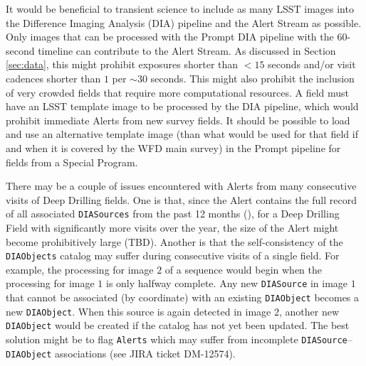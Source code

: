 \documentclass[DM,lsstdoc,toc]{lsstdoc}
\begin{document}
It would be beneficial to transient science to include as many LSST images into the Difference Imaging Analysis (DIA) pipeline and the Alert Stream as possible. Only images that can be processed with the Prompt DIA pipeline with the $60$-second timeline can contribute to the Alert Stream. As discussed in Section \ref{sec:data}, this might prohibit exposures shorter than $<15$ seconds and/or visit cadences shorter than $1$ per $\sim30$ seconds. This might also prohibit the inclusion of very crowded fields that require more computational resources. A field must have an LSST template image to be processed by the DIA pipeline, which would prohibit immediate Alerts from new survey fields. It should be possible to load and use an alternative template image (than what would be used for that field if and when it is covered by the WFD main survey) in the Prompt pipeline for fields from a Special Program. 

There may be a couple of issues encountered with Alerts from many consecutive visits of Deep Drilling fields. One is that, since the Alert contains the full record of all associated {\tt DIASources} from the past 12 months (), for a Deep Drilling Field with significantly more visits over the year, the size of the Alert might become prohibitively large (TBD). Another is that the self-consistency of the \texttt{DIAObjects} catalog may suffer during consecutive visits of a single field. For example, the processing for image $2$ of a sequence would begin when the processing for image $1$ is only halfway complete. Any new {\tt DIASource} in image $1$ that cannot be associated (by coordinate) with an existing {\tt DIAObject} becomes a new {\tt DIAObject}. When this source is again detected in image $2$, another new {\tt DIAObject} would be created if the catalog has not yet been updated. The best solution might be to flag {\tt Alerts} which may suffer from incomplete {\tt DIASource}--{\tt DIAObject} associations (see JIRA ticket DM-12574). 

\end{document}
